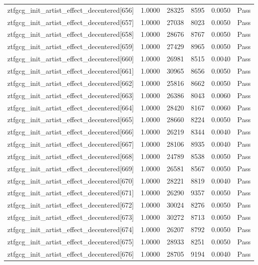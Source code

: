 \begin{table}[htbp]
\begin{tabular}{llrrll}
ztfgcg\_init\_artist\_effect\_decentered[656] & 1.0000 & 28325 & 8595 & 0.0050 & Pass \\
ztfgcg\_init\_artist\_effect\_decentered[657] & 1.0000 & 27038 & 8023 & 0.0050 & Pass \\
ztfgcg\_init\_artist\_effect\_decentered[658] & 1.0000 & 28676 & 8767 & 0.0050 & Pass \\
ztfgcg\_init\_artist\_effect\_decentered[659] & 1.0000 & 27429 & 8965 & 0.0050 & Pass \\
ztfgcg\_init\_artist\_effect\_decentered[660] & 1.0000 & 26981 & 8515 & 0.0040 & Pass \\
ztfgcg\_init\_artist\_effect\_decentered[661] & 1.0000 & 30965 & 8656 & 0.0050 & Pass \\
ztfgcg\_init\_artist\_effect\_decentered[662] & 1.0000 & 25816 & 8662 & 0.0050 & Pass \\
ztfgcg\_init\_artist\_effect\_decentered[663] & 1.0000 & 26386 & 8043 & 0.0060 & Pass \\
ztfgcg\_init\_artist\_effect\_decentered[664] & 1.0000 & 28420 & 8167 & 0.0060 & Pass \\
ztfgcg\_init\_artist\_effect\_decentered[665] & 1.0000 & 28660 & 8224 & 0.0050 & Pass \\
ztfgcg\_init\_artist\_effect\_decentered[666] & 1.0000 & 26219 & 8344 & 0.0040 & Pass \\
ztfgcg\_init\_artist\_effect\_decentered[667] & 1.0000 & 28106 & 8935 & 0.0040 & Pass \\
ztfgcg\_init\_artist\_effect\_decentered[668] & 1.0000 & 24789 & 8538 & 0.0050 & Pass \\
ztfgcg\_init\_artist\_effect\_decentered[669] & 1.0000 & 26581 & 8567 & 0.0050 & Pass \\
ztfgcg\_init\_artist\_effect\_decentered[670] & 1.0000 & 28221 & 8819 & 0.0040 & Pass \\
ztfgcg\_init\_artist\_effect\_decentered[671] & 1.0000 & 26290 & 9357 & 0.0050 & Pass \\
ztfgcg\_init\_artist\_effect\_decentered[672] & 1.0000 & 30024 & 8276 & 0.0050 & Pass \\
ztfgcg\_init\_artist\_effect\_decentered[673] & 1.0000 & 30272 & 8713 & 0.0050 & Pass \\
ztfgcg\_init\_artist\_effect\_decentered[674] & 1.0000 & 26207 & 8792 & 0.0050 & Pass \\
ztfgcg\_init\_artist\_effect\_decentered[675] & 1.0000 & 28933 & 8251 & 0.0050 & Pass \\
ztfgcg\_init\_artist\_effect\_decentered[676] & 1.0000 & 28705 & 9194 & 0.0040 & Pass \\

\end{tabular}
\end{table}
